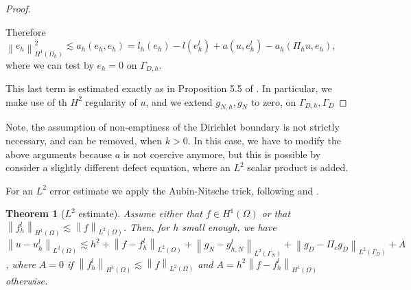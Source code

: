 \documentclass[english,a4paper,10pt,oneside]{scrbook}	%
\theoremstyle{break}
\newtheorem{thm}[equation]{Theorem}
\newenvironment{mproof}[1][\proofname]{%
  \begin{proof}[#1]$ $\par\nobreak\ignorespaces
}{%
  \end{proof}
}
\renewcommand*{\proofname}{Proof}
\theoremstyle{remark}
\newcommand{\norm}[1]{\left\lVert#1\right\rVert}
\begin{document}
\begin{mproof}
Therefore $\norm{e_h}^2_{H^1(\Omega_h)}\lesssim a_h(e_h,e_h) = l_h(e_h)-l(e_h^l) + a(u,e_h^l)-a_h(\Pi_h u, e_h)$, where we can test by $e_h=0$ on $\Gamma_{D,h}$.

This last term is estimated exactly as in Proposition 5.5 of \cite{edelmann}. In particular, we make use of th $H^2$ regularity of $u$, and we extend $g_{N,h}, g_N$ to zero, on $\Gamma_{D,h}, \Gamma_D$

\end{mproof}


Note, the assumption of non-emptiness of the Dirichlet boundary is not strictly necessary, and can be removed, when $k>0$. In this case, we have to modify the above arguments because $a$ is not coercive anymore, but this is possible by consider a slightly different defect equation, where an $L^2$ scalar product is added.


For an $L^2$ error estimate we apply the Aubin-Nitsche trick, following \cite{fairweather} and \cite{edelmann}.

\begin{thm}[$L^2$ estimate]
\label{thm:L2_est_ell}
Assume either that $f \in H^1(\Omega)$ or that $\norm{f^l_h}_{H^1(\Omega)}\lesssim \norm{f}_{L^2(\Omega)}$. Then, for $h$ small enough, we have $\norm{u-u_h^l}_{L^2(\Omega)}\lesssim h^2 + \norm{f-f_h^l}_{L^2(\Omega)}+ \norm{g_N-g_{h,N}^l}_{L^2(\Gamma_N)} + \norm{g_D - \Pi_c g_D}_{L^2(\Gamma_D)} + A$, where $A = 0$ if  $\norm{f^l_h}_{H^1(\Omega)}\lesssim \norm{f}_{L^2(\Omega)}$ and $A = h^2\norm{f-f_h^l}_{H^1(\Omega)}$ otherwise.
\end{thm}
\end{document}
